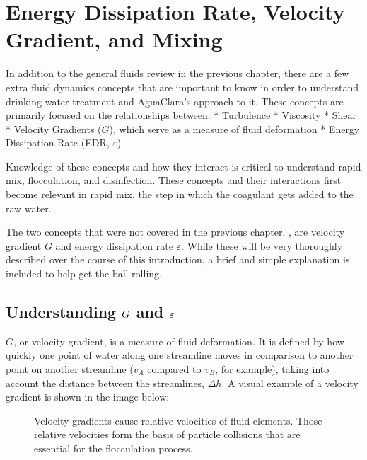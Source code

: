 \documentclass[letterpaper,10pt,english]{sphinxmanual}
\let\sphinxpxdimen\pdfpxdimen\else\newdimen\sphinxpxdimen
\begin{document}
\section{Energy Dissipation Rate, Velocity Gradient, and Mixing}
\label{\detokenize{Rapid_Mix/RM_Intro:energy-dissipation-rate-velocity-gradient-and-mixing}}\label{\detokenize{Rapid_Mix/RM_Intro:heading-edr-g-and-mixing}}
In addition to the general fluids review in the previous chapter, there are a few extra fluid dynamics concepts that are important to know in order to understand drinking water treatment and AguaClara’s approach to it. These concepts are primarily focused on the relationships between: * Turbulence * Viscosity * Shear * Velocity Gradients (\(G\)), which serve as a measure of fluid deformation * Energy Dissipation Rate (EDR, \(\varepsilon\))

Knowledge of these concepts and how they interact is critical to understand rapid mix, flocculation, and disinfection. These concepts and their interactions first become relevant in rapid mix, the step in which the coagulant gets added to the raw water.

The two concepts that were not covered in the previous chapter, {\hyperref[\detokenize{Review/Review_Fluid_Mechanics:title-review-fluid-mechanics}]{}}, are velocity gradient \(G\) and energy dissipation rate \(\varepsilon\). While these will be very thoroughly described over the course of this introduction, a brief and simple explanation is included to help get the ball rolling.


\subsection{Understanding \protect\(G\protect\) and \protect\(\varepsilon\protect\)}
\label{\detokenize{Rapid_Mix/RM_Intro:understanding-and}}
\(G\), or velocity gradient, is a measure of fluid deformation. It is defined by how quickly one point of water along one streamline moves in comparison to another point on another streamline (\(v_A\) compared to \(v_B\), for example), taking into account the distance between the streamlines, \(\Delta h\). A visual example of a velocity gradient is shown in the image below:

\begin{figure}[htbp]
\centering
\capstart

\noindent\sphinxincludegraphics[width=700\sphinxpxdimen]{{Velocity_gradient_image}.jpg}
\caption{Velocity gradients cause relative velocities of fluid elements. Those relative velocities form the basis of particle collisions that are essential for the flocculation process.}\label{\detokenize{Rapid_Mix/RM_Intro:id5}}\label{\detokenize{Rapid_Mix/RM_Intro:figure-velocity-gradient-image}}\end{figure}
\end{document}
